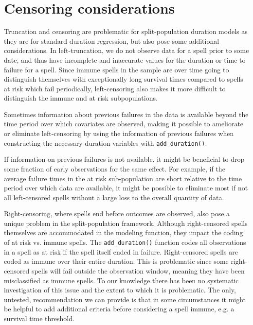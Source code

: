 \documentclass[letter]{article}
\begin{document}
\section{Censoring considerations}

Truncation and censoring are problematic for split-population duration models as they are for standard duration regression, but also pose some additional considerations. In left-truncation, we do not observe data for a spell prior to some date, and thus have incomplete and inaccurate values for the duration or time to failure for a spell. Since immune spells in the sample are over time going to distinguish themselves with exceptionally long survival times compared to spells at risk which fail periodically, left-censoring also makes it more difficult to distinguish the immune and at risk subpopulations. 

Sometimes information about previous failures in the data is available beyond the time period over which covariates are observed, making it possible to ameliorate or eliminate left-censoring by using the information of previous failures when constructing the necessary duration variables with \texttt{add\_duration()}. 

If information on previous failures is not available, it might be beneficial to drop some fraction of early observations for the same effect. For example, if the average failure times in the at risk sub-population are short relative to the time period over which data are available, it might be possible to eliminate most if not all left-censored spells without a large loss to the overall quantity of data. 

Right-censoring, where spells end before outcomes are observed, also pose a unique problem in the split-population framework. Although right-censored spells themselves are accommodated in the modeling function, they impact the coding of at risk vs. immune spells. The \texttt{add\_duration()} function codes all observations in a spell as at risk if the spell itself ended in failure. Right-censored spells are coded as immune over their entire duration. This is problematic since some right-censored spells will fail outside the observation window, meaning they have been misclassified as immune spells. To our knowledge there has been no systematic investigation of this issue and the extent to which it is problematic. The only, untested, recommendation we can provide is that in some circumstances it might be helpful to add additional criteria before considering a spell immune, e.g. a survival time threshold. 
\end{document}
